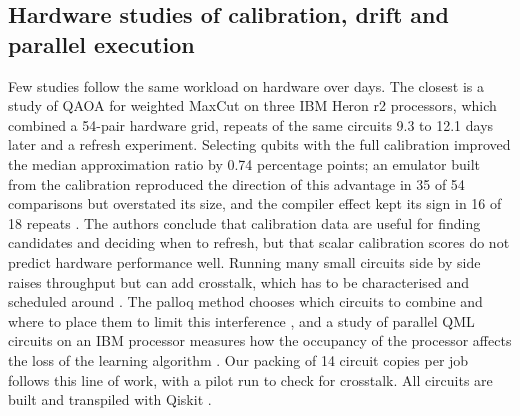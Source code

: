 \documentclass[10pt,conference]{IEEEtran}
\begin{document}
\subsection{Hardware studies of calibration, drift and parallel execution}
Few studies follow the same workload on hardware over days. The closest is a study of QAOA for
weighted MaxCut on three IBM Heron r2 processors, which combined a 54-pair hardware grid,
repeats of the same circuits 9.3 to 12.1 days later and a refresh experiment. Selecting qubits
with the full calibration improved the median approximation ratio by 0.74 percentage points; an
emulator built from the calibration reproduced the direction of this advantage in 35 of 54
comparisons but overstated its size, and the compiler effect kept its sign in 16 of 18 repeats
\cite{qaoa2026drift}. The authors conclude that calibration data are useful for finding
candidates and deciding when to refresh, but that scalar calibration scores do not predict
hardware performance well. Running many small circuits side by side raises throughput but can
add crosstalk, which has to be characterised and scheduled around \cite{murali2020crosstalk}.
The palloq method chooses which circuits to combine and where to place them to limit this
interference \cite{ohkura2022simultaneous}, and a study of parallel QML circuits on an IBM
processor measures how the occupancy of the processor affects the loss of the learning
algorithm \cite{parallelqml2024}. Our packing of 14 circuit copies per job follows
this line of work, with a pilot run to check for crosstalk. All circuits are built and
transpiled with Qiskit \cite{javadiabhari2024qiskit}.
\end{document}
